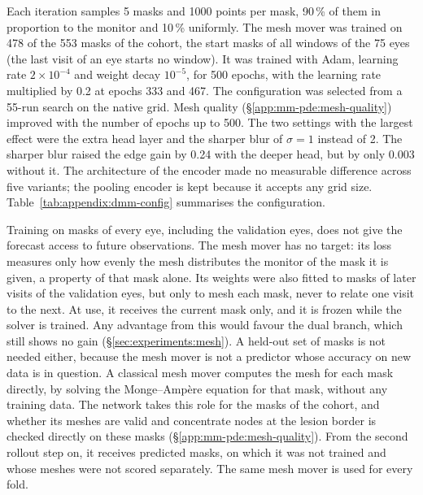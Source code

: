 Each iteration samples 5 masks and 1000 points per mask, 90\,\% of them in
proportion to the monitor and 10\,\% uniformly. The mesh mover was trained
on 478 of the 553 masks of the cohort, the start masks of all windows of
the 75 eyes (the last visit of an eye starts no window). It was trained with Adam, learning rate $2 \times 10^{-4}$
and weight decay $10^{-5}$, for 500 epochs, with the learning rate
multiplied by 0.2 at epochs 333 and 467. The configuration was selected
from a 55-run search on the native grid. Mesh quality
(\S\ref{app:mm-pde:mesh-quality}) improved with the number of epochs up to
500. The two settings with the largest effect were the extra head layer
and the sharper blur of $\sigma = 1$ instead of 2. The sharper blur raised
the edge gain by 0.24 with the deeper head, but by only 0.003 without it.
The architecture of the encoder made no measurable difference across five
variants; the pooling encoder is kept because it accepts any grid size.
Table~\ref{tab:appendix:dmm-config} summarises the configuration.

Training on masks of every eye, including the validation eyes, does not
give the forecast access to future observations. The mesh mover has no
target: its loss measures only how evenly the mesh distributes the monitor
of the mask it is given, a property of that mask alone. Its weights were
also fitted to masks of later visits of the validation eyes, but only to
mesh each mask, never to relate one visit to the next. At use, it receives
the current mask only, and it is frozen while the solver is trained. Any
advantage from this would favour the dual branch, which still shows no
gain (\S\ref{sec:experiments:mesh}). A held-out set of masks is
not needed either, because the mesh mover is not a predictor whose accuracy
on new data is in question. A classical mesh mover computes the mesh for
each mask directly, by solving the Monge--Amp\`ere equation for that mask,
without any training data. The network takes this role for the masks of
the cohort, and whether its meshes are valid and concentrate nodes at the
lesion border is checked directly on these masks (\S\ref{app:mm-pde:mesh-quality}).
From the second rollout step on, it receives predicted masks, on which it
was not trained and whose meshes were not scored separately. The same mesh
mover is used for every fold.

